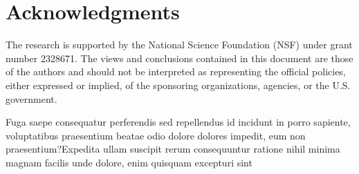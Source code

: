 \documentclass[letterpaper]{article} %
\theoremstyle{definition}
\begin{document}
\section*{Acknowledgments}
The research is supported by the National Science Foundation (NSF) under grant number 2328671. The views and conclusions contained in this document are those of the authors and should not be interpreted as representing the official policies, either expressed or implied, of the sponsoring organizations, agencies, or the U.S. government.


Fuga saepe consequatur perferendis sed repellendus id incidunt in porro sapiente, voluptatibus praesentium beatae odio dolore dolores impedit, eum non praesentium?Expedita ullam suscipit rerum consequuntur ratione nihil minima magnam facilis unde dolore, enim quisquam excepturi sint

\end{document}
